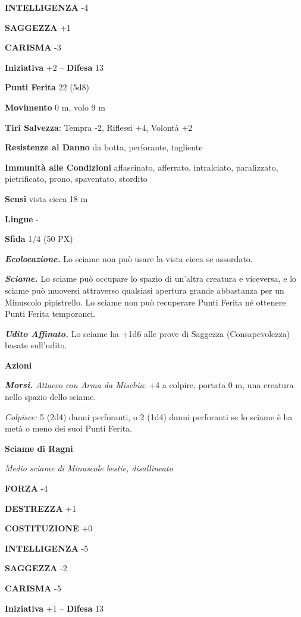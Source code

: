 \begin{multicols}{2}
\textbf{INTELLIGENZA} -4

\textbf{SAGGEZZA} +1

\textbf{CARISMA} -3

\textbf{Iniziativa} +2 -- \textbf{Difesa} 13

\textbf{Punti Ferita} 22 (5d8)

\textbf{Movimento} 0 m, volo 9 m

\textbf{Tiri Salvezza}: Tempra -2, Riflessi +4, Volontà +2

\textbf{Resistenze al Danno} da botta, perforante, tagliente

\textbf{Immunità alle Condizioni} affascinato, afferrato, intralciato, paralizzato, pietrificato, prono, spaventato, stordito

\textbf{Sensi} vista cieca 18 m

\textbf{Lingue} -

\textbf{Sfida} 1/4 (50 PX)

\textit{\textbf{Ecolocazione.}} Lo sciame non può usare la vista cieca se assordato.

\textit{\textbf{Sciame.}} Lo sciame può occupare lo spazio di un'altra creatura e viceversa, e lo sciame può muoversi attraverso qualsiasi apertura grande abbastanza per un Minuscolo pipistrello. Lo sciame non può recuperare Punti Ferita né ottenere Punti Ferita temporanei.

\textit{\textbf{Udito Affinato.}} Lo sciame ha +1d6 alle prove di Saggezza (Consapevolezza) basate sull'udito.

\textbf{Azioni}

\textit{\textbf{Morsi.} Attacco con Arma da Mischia}: +4 a colpire, portata 0 m, una creatura nello spazio dello sciame.

\textit{Colpisce:} 5 (2d4) danni perforanti, o 2 (1d4) danni perforanti se lo sciame è ha metà o meno dei suoi Punti Ferita.

\medskip\textbf{Sciame di Ragni}

\textit{Medio sciame di Minuscole bestie, disallineato}

\textbf{FORZA} -4

\textbf{DESTREZZA} +1

\textbf{COSTITUZIONE} +0

\textbf{INTELLIGENZA} -5

\textbf{SAGGEZZA} -2

\textbf{CARISMA} -5

\textbf{Iniziativa} +1 -- \textbf{Difesa} 13


\end{multicols}
